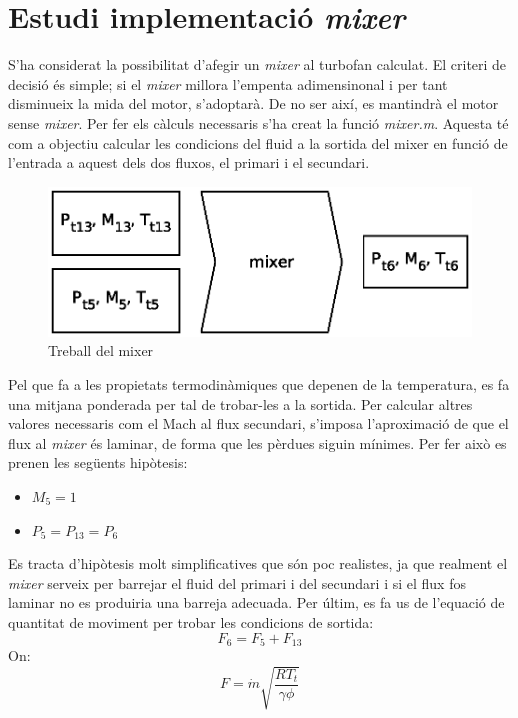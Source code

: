 \section{Estudi implementació \textit{mixer}}
S'ha considerat la possibilitat d'afegir un \textit{mixer} al turbofan calculat. El criteri de decisió és simple; si el \textit{mixer} millora l'empenta adimensinonal i per tant disminueix la mida del motor, s'adoptarà. De no ser així, es mantindrà el motor sense \textit{mixer}. Per fer els càlculs necessaris s'ha creat la funció \textit{mixer.m}. Aquesta té com a objectiu calcular les condicions del fluid a la sortida del mixer en funció de l'entrada a aquest dels dos fluxos, el primari i el secundari.
\begin{figure}[H]
	\centering
	\includegraphics[scale=0.65]{./pics/mixer.eps}
	\caption{Treball del mixer}
\end{figure}
\noindent Pel que fa a les propietats termodinàmiques que depenen de la temperatura, es fa una mitjana ponderada per tal de trobar-les a la sortida. Per calcular altres valores necessaris com el Mach al flux secundari, s'imposa l'aproximació de que el flux al \textit{mixer} és laminar, de forma que les pèrdues siguin mínimes. Per fer això es prenen les següents hipòtesis:
\begin{itemize}
\item $M_5 = 1$
\item $P_5 = P_{13} = P_6$
\end{itemize}
Es tracta d'hipòtesis molt simplificatives que són poc realistes, ja que realment el \textit{mixer} serveix per barrejar el fluid del primari i del secundari i si el flux fos laminar no es produiria una barreja adecuada. 
Per últim, es fa us de l'equació de quantitat de moviment per trobar les condicions de sortida:
\begin{equation}
\label{ccm}
F_6 = F_5 + F_{13}
\end{equation}
On:
\begin{equation}
F = \dot{m}\sqrt{\frac{RT_t}{\gamma\phi}}
\end{equation}
